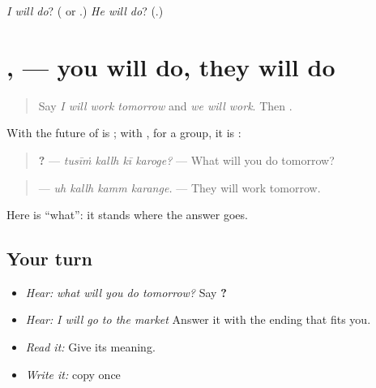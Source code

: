 \begin{tcolorbox}[breakable,colback=teal!4,colframe=teal!35!black,title={Before you move on}]
\emph{I will do}? (\textbf{} or \textbf{}.) \emph{He will do}? (\textbf{}.)
\end{tcolorbox}
\section[\texorpdfstring{\pa{ਕਰੋਗੇ} · \pa{ਕਰਨਗੇ} (karoge · karange)}{ਕਰੋਗੇ · ਕਰਨਗੇ (karoge · karange)}]{,  — you will do, they will do}

\label{lesson:PA-C222-karoge}



\begin{quote}
Say \emph{I will work tomorrow} and \emph{we will work}. Then \textbf{}.
\end{quote}

\begin{grammarlens}[title={Grammar Lens: two more cells}]
With \textbf{} the future of \textbf{} is \textbf{}; with \textbf{}, for a group, it is \textbf{}:

\begin{quote}
\textbf{   ?} — \emph{tusīṁ kallh kī karoge?} — What will you do tomorrow?
\end{quote}

\begin{quote}
\textbf{   } — \emph{uh kallh kamm karange.} — They will work tomorrow.
\end{quote}

Here \textbf{} is \textquotedblleft{}what\textquotedblright{}: it stands where the answer goes.
\end{grammarlens}

\subsection*{Your turn}
\begin{itemize}
\raggedright
  \item \emph{Hear:} \emph{what will you do tomorrow?} Say \textbf{   ?}
  \item \emph{Hear:} \emph{I will go to the market} Answer it with the ending that fits you.
  \item \emph{Read it:} \textbf{   } Give its meaning.
  \item \emph{Write it:} copy \textbf{} once
\end{itemize}

